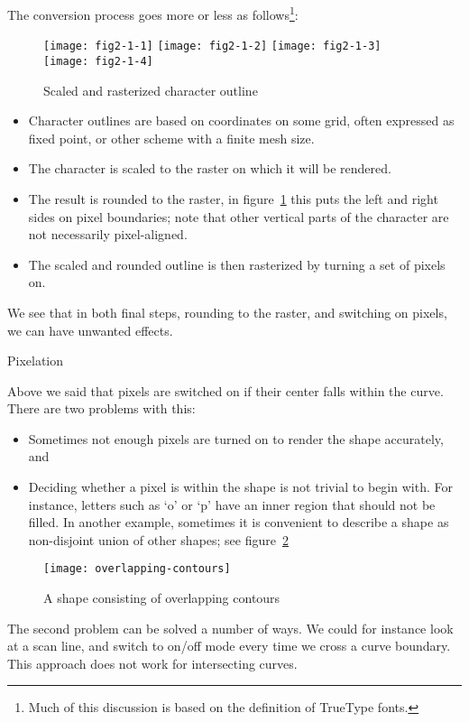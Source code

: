 The conversion process goes more or less as follows\footnote{Much of
  this discussion is based on the definition of TrueType fonts.}:
\begin{figure}[ht]
\texttt{[image: fig2-1-1]}
\texttt{[image: fig2-1-2]}
\texttt{[image: fig2-1-3]}
\texttt{[image: fig2-1-4]}
\caption{Scaled and rasterized character outline}
\label{fig:raster-H}
\end{figure}
\begin{itemize}
\item Character outlines are based on coordinates on some grid, often
  expressed as fixed point, or other scheme with a finite mesh size.
\item The character is scaled to the raster on which it will be
  rendered.
\item The result is rounded to the raster, in
  figure~\ref{fig:raster-H} this puts the left and right sides on
  pixel boundaries; note that other vertical parts of the character
  are not necessarily pixel-aligned.
\item The scaled and rounded outline is then rasterized by turning a
  set of pixels on.
\end{itemize}
We see that in both final steps, rounding to the raster, and switching
on pixels, we can have unwanted effects.

 {Pixelation}

Above we said that pixels are switched on if their center falls within
the curve. There are two problems with this:
\begin{itemize}
\item Sometimes not enough pixels are turned on to render the shape
  accurately, and
\item Deciding whether a pixel is within the shape is not trivial to
  begin with. For instance, letters such as `o' or `p' have an inner
  region that should not be filled. In another example, sometimes it
  is convenient to describe a shape as non-disjoint union of other
  shapes; see figure~\ref{fig:q=l+o}
\end{itemize}
\begin{figure}[ht]
\texttt{[image: overlapping-contours]}
\caption{A shape consisting of overlapping contours}
\label{fig:q=l+o}
\end{figure}
The second problem can be solved a number of ways. We could for
instance look at a scan line, and switch to on/off mode every time we
cross a curve boundary. This approach does not work for intersecting
curves.

